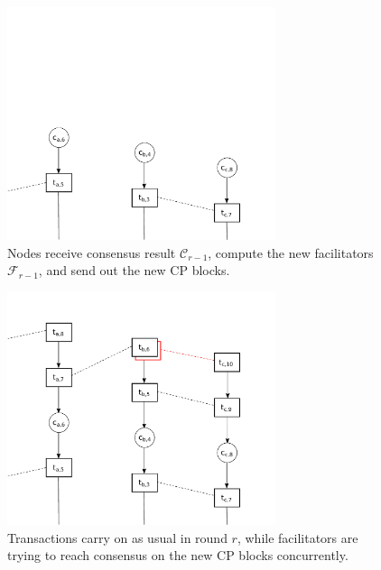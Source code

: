 \documentclass{beamer}
\begin{document}
\begin{frame}{\subsecname}
  \begin{figure}[h]
  \includegraphics[width=0.7\textwidth]{trustchain-2}
  \centering
  \caption{Nodes receive consensus result $\mathcal{C}_{r - 1}$,
    compute the new facilitators $\mathcal{F}_{r-1}$,
    and send out the new CP blocks.}
  \end{figure}
\end{frame}

\begin{frame}{\subsecname}
  \begin{figure}[h]
  \includegraphics[width=0.7\textwidth]{trustchain-3}
  \centering
  \caption{Transactions carry on as usual in round $r$,
  while facilitators are trying to reach consensus on the new CP blocks concurrently.}
  \end{figure}
\end{frame}
\end{document}
